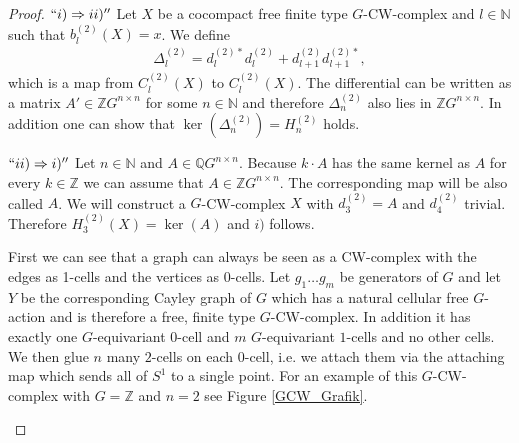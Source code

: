 \documentclass[12pt,a4paper]{scrartcl}
\theoremstyle{plain}
\theoremstyle{definition}
\numberwithin{equation}{section}
\newcommand{\Q}{\mathbb{Q}} %
\newcommand{\Z}{\mathbb{Z}} %
\newcommand{\N}{\mathbb{N}} %
\newcommand{\2}{\mathbb{Z} / 2 \mathbb{Z}}
\newcommand{\1}{\bar{1}}
\newcommand{\0}{\bar{0}}
\begin{document}
\begin{proof}
	$``i) \Rightarrow ii)''$ Let $X$ be a cocompact free finite type $G$-CW-complex and $l \in \N$ such that $b_l^{(2)}(X)=x$. We define 
	\begin{align*}
		\Delta_l^{(2)} = d_l^{(2)*} d_l^{(2)} + d_{l+1}^{(2)} d_{l+1}^{(2)*},
	\end{align*}
	which is a map from $C_l^{(2)}(X)$ to $C_l^{(2)}(X)$. The differential can be written as a matrix $A' \in \Z G^{n \times n}$ for some $n \in \N$ and therefore $\Delta_n^{(2)}$ also lies in $\Z G^{n \times n}$. In addition one can show that $\ker(\Delta_n^{(2)}) = H_n^{(2)}$ holds.
	
	$``ii) \Rightarrow i)''$ Let $n \in \N$ and $A\in \Q G^{n \times n}$. Because $k \cdot A$ has the same kernel as $A$ for every $k \in \Z$ we can assume that $A \in \Z G^{n \times n}$. The corresponding map will be also called $A$. We will construct a $G$-CW-complex $X$ with $d_3^{(2)} = A$ and $d_4^{(2)}$ trivial. Therefore $H_3^{(2)}(X) = \ker(A)$ and $i)$ follows.
	
	First we can see that a graph can always be seen as a CW-complex with the edges as 1-cells and the vertices as 0-cells. Let $g_1 \ldots g_m$ be generators of $G$ and let $Y$ be the corresponding Cayley graph of $G$ which has a natural cellular free $G$-action and is therefore a free, finite type $G$-CW-complex. In addition it has exactly one $G$-equivariant $0$-cell and $m$ $G$-equivariant $1$-cells and no other cells. We then glue $n$ many $2$-cells on each $0$-cell, i.e. we attach them via the attaching map which sends all of $S^1$ to a single point. For an example of this $G$-CW-complex with $G = \Z$ and $n = 2$ see Figure \ref{GCW_Grafik}.
	\begin{figure}[H]
		\centering
\end{figure}
\end{proof}
\end{document}
